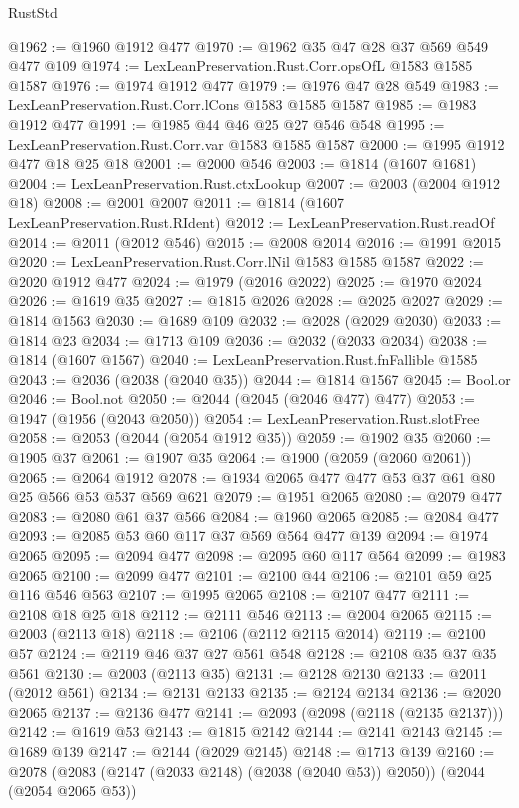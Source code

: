 \begin{lexlean}{RustStd}
\begin{coremodule}
{\begin{coremodule}
{{{{{{{{{{{{{{@1962 := @1960 @1912 @477
@1970 := @1962 @35 @47 @28 @37 @569 @549 @477 @109
@1974 := LexLeanPreservation.Rust.Corr.opsOfL @1583 @1585 @1587
@1976 := @1974 @1912 @477
@1979 := @1976 @47 @28 @549
@1983 := LexLeanPreservation.Rust.Corr.lCons @1583 @1585 @1587
@1985 := @1983 @1912 @477
@1991 := @1985 @44 @46 @25 @27 @546 @548
@1995 := LexLeanPreservation.Rust.Corr.var @1583 @1585 @1587
@2000 := @1995 @1912 @477 @18 @25 @18
@2001 := @2000 @546
@2003 := @1814 (@1607 @1681)
@2004 := LexLeanPreservation.Rust.ctxLookup
@2007 := @2003 (@2004 @1912 @18)
@2008 := @2001 @2007
@2011 := @1814 (@1607 LexLeanPreservation.Rust.RIdent)
@2012 := LexLeanPreservation.Rust.readOf
@2014 := @2011 (@2012 @546)
@2015 := @2008 @2014
@2016 := @1991 @2015
@2020 := LexLeanPreservation.Rust.Corr.lNil @1583 @1585 @1587
@2022 := @2020 @1912 @477
@2024 := @1979 (@2016 @2022)
@2025 := @1970 @2024
@2026 := @1619 @35
@2027 := @1815 @2026
@2028 := @2025 @2027
@2029 := @1814 @1563
@2030 := @1689 @109
@2032 := @2028 (@2029 @2030)
@2033 := @1814 @23
@2034 := @1713 @109
@2036 := @2032 (@2033 @2034)
@2038 := @1814 (@1607 @1567)
@2040 := LexLeanPreservation.Rust.fnFallible @1585
@2043 := @2036 (@2038 (@2040 @35))
@2044 := @1814 @1567
@2045 := Bool.or
@2046 := Bool.not
@2050 := @2044 (@2045 (@2046 @477) @477)
@2053 := @1947 (@1956 (@2043 @2050))
@2054 := LexLeanPreservation.Rust.slotFree
@2058 := @2053 (@2044 (@2054 @1912 @35))
@2059 := @1902 @35
@2060 := @1905 @37
@2061 := @1907 @35
@2064 := @1900 (@2059 (@2060 @2061))
@2065 := @2064 @1912
@2078 := @1934 @2065 @477 @477 @53 @37 @61 @80 @25 @566 @53 @537 @569 @621
@2079 := @1951 @2065
@2080 := @2079 @477
@2083 := @2080 @61 @37 @566
@2084 := @1960 @2065
@2085 := @2084 @477
@2093 := @2085 @53 @60 @117 @37 @569 @564 @477 @139
@2094 := @1974 @2065
@2095 := @2094 @477
@2098 := @2095 @60 @117 @564
@2099 := @1983 @2065
@2100 := @2099 @477
@2101 := @2100 @44
@2106 := @2101 @59 @25 @116 @546 @563
@2107 := @1995 @2065
@2108 := @2107 @477
@2111 := @2108 @18 @25 @18
@2112 := @2111 @546
@2113 := @2004 @2065
@2115 := @2003 (@2113 @18)
@2118 := @2106 (@2112 @2115 @2014)
@2119 := @2100 @57
@2124 := @2119 @46 @37 @27 @561 @548
@2128 := @2108 @35 @37 @35 @561
@2130 := @2003 (@2113 @35)
@2131 := @2128 @2130
@2133 := @2011 (@2012 @561)
@2134 := @2131 @2133
@2135 := @2124 @2134
@2136 := @2020 @2065
@2137 := @2136 @477
@2141 := @2093 (@2098 (@2118 (@2135 @2137)))
@2142 := @1619 @53
@2143 := @1815 @2142
@2144 := @2141 @2143
@2145 := @1689 @139
@2147 := @2144 (@2029 @2145)
@2148 := @1713 @139
@2160 := @2078 (@2083 (@2147 (@2033 @2148) (@2038 (@2040 @53)) @2050)) (@2044 (@2054 @2065 @53))
}}}}}}}}}}}}}}
\end{coremodule}}
\end{coremodule}
\end{lexlean}
